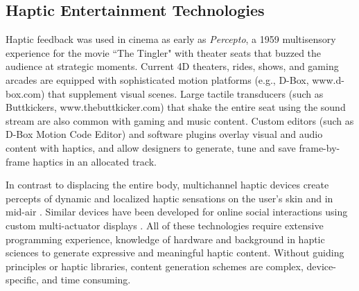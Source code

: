 \subsection{Haptic Entertainment Technologies}
Haptic feedback was %
used in cinema as early as \emph{Percepto}, a 1959 multisensory experience for the movie ``The Tingler"  \cite{IJsselsteijn2003} %
with theater seats %
that buzzed the audience at strategic moments. %
Current 4D theaters, rides, shows, and gaming arcades are equipped with sophisticated motion platforms (e.g., D-Box, www.d-box.com) that supplement visual scenes. %
Large tactile transducers (such as Buttkickers, www.thebuttkicker.com) that shake the entire seat using the sound stream are also common with gaming and music content. %
Custom editors (such as D-Box Motion Code Editor) and software plugins %
overlay visual and audio content with haptics, and allow designers to generate, tune and save frame-by-frame haptics in an allocated track. %

In contrast to displacing the entire body, multichannel haptic devices create percepts of dynamic and localized haptic sensations on the user's skin \cite{Israr2011} and in mid-air \cite{Wilson2014}.
Similar devices have been %
developed for online social interactions using custom multi-actuator displays  %
\cite{Kim2009,Tsetserukou2009,Paneels2013}. %
All of these technologies require extensive programming experience, knowledge of hardware and background in haptic sciences to generate expressive and meaningful haptic content. 
Without guiding principles or haptic libraries,  content generation schemes are complex, device-specific, and time consuming. 


